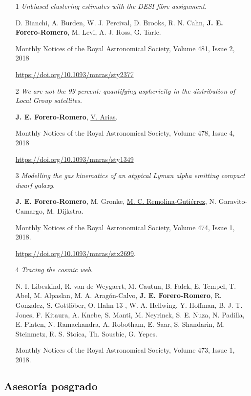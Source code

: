 \documentclass{article}
\begin{document}
\begin{itemize}

\item[1]{\it Unbiased clustering estimates with the DESI fibre
  assignment}. 

D. Bianchi, A. Burden,  W. J. Percival, D. Brooks,
R. N. Cahn, {\bf J. E. Forero-Romero}, M. Levi, A. J. Ross, G. Tarle.

Monthly Notices of the Royal Astronomical Society, Volume 481, Issue
2, 2018

\url{https://doi.org/10.1093/mnras/sty2377}

\item[2]{\it We are not the 99 percent: quantifying asphericity in the
  distribution of Local Group satellites}.

{\bf J. E. Forero-Romero}, \underline{\underline{V. Arias}}.

Monthly Notices of the Royal Astronomical Society, Volume 478, Issue
4, 2018

\url{https://doi.org/10.1093/mnras/sty1349}

\item[3]{\it Modelling the gas kinematics of an atypical Lyman alpha
emitting compact dwarf galaxy}.

{\bf J. E. Forero-Romero}, M. Gronke,
  \underline{M. C. Remolina-Guti\'errez}, N. Garavito-Camargo, M. Dijkstra.

  Monthly Notices of the Royal Astronomical Society, Volume 474, Issue
  1, 2018. 

\url{https://doi.org/10.1093/mnras/stx2699}.  

\item[4]{\it Tracing the cosmic web}.

N. I. Libeskind, R. van de
  Weygaert, M. Cautun, B. Falck, E. Tempel, T. Abel, M. Alpaslan, M. A. Aragón-Calvo, {\bf
  J. E. Forero-Romero},  R. Gonzalez, S. Gottl\"ober, O. Hahn 13 ,
W. A. Hellwing, Y. Hoffman, B. J. T. Jones, F. Kitaura, A. Knebe,
S. Manti, M. Neyrinck, S. E. Nuza, N. Padilla, E. Platen,
N. Ramachandra, A. Robotham, E. Saar, S. Shandarin, M. Steinmetz,
R. S. Stoica, Th. Sousbie, G. Yepes.

Monthly Notices of the Royal Astronomical Society, Volume 473, Issue
1, 2018. 
\end{itemize}

\subsection{Asesor\'ia posgrado}
\end{document}
